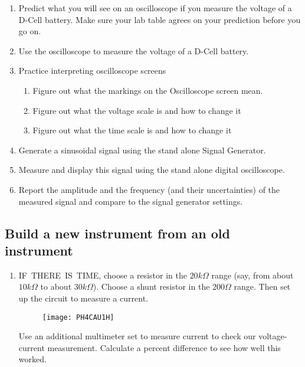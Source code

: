 \begin{enumerate}
\item Predict what you will see on an oscilloscope if you measure the voltage of a D-Cell battery. Make sure your lab table agrees on your prediction before you go on.

\item Use the oscilloscope to measure the voltage of a D-Cell battery.

\item Practice interpreting oscilloscope screens

\begin{enumerate}
\item Figure out what the markings on the Oscilloscope screen mean.

\item Figure out what the voltage scale is and how to change it

\item Figure out what the time scale is and how to change it
\end{enumerate}

\item Generate a sinusoidal signal using the stand alone Signal Generator.

\item Measure and display this signal using the stand alone digital
oscilloscope.

\item Report the amplitude and the frequency (and their uncertainties) of
the measured signal and compare to the signal generator settings.
\end{enumerate}

\subsection{Build a new instrument from an old instrument}

\begin{enumerate}
\item IF\ THERE\ IS\ TIME, choose a resistor in the $20\unit{k\Omega}$ range (say, from about $10\unit{k\Omega}$ to about $30\unit{k\Omega}$). Choose a shunt resistor in the $200\unit{\Omega}$ range. Then set up the circuit to measure a current. 

\begin{figure}[h!]
	\centering
    \texttt{[image: PH4CAU1H]}
    \label{New Instrument and Test}
\end{figure}

Use an additional multimeter set to measure current to check our
voltage-current measurement. Calculate a percent difference to see how well
this worked.
\end{enumerate}


\vspace*{\fill}
\pagebreak